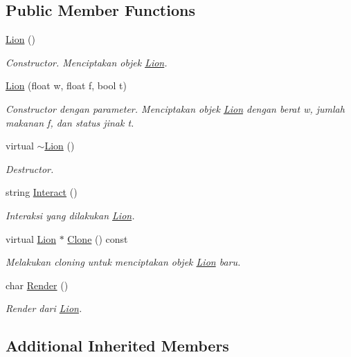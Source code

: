 \subsection*{Public Member Functions}
\begin{DoxyCompactItemize}
\item 
\hyperlink{classLion_a582202364024a9ce10e57f47c872dbc2}{Lion} ()
\begin{DoxyCompactList}\small\item\em Constructor. Menciptakan objek \hyperlink{classLion}{Lion}. \end{DoxyCompactList}\item 
\hyperlink{classLion_a5bc46f23f72bc31fe8ef58db40a62b58}{Lion} (float w, float f, bool t)
\begin{DoxyCompactList}\small\item\em Constructor dengan parameter. Menciptakan objek \hyperlink{classLion}{Lion} dengan berat w, jumlah makanan f, dan status jinak t. \end{DoxyCompactList}\item 
virtual \hyperlink{classLion_a09c9c113e6ca2d7c7b304b009d61dc62}{$\sim$\+Lion} ()
\begin{DoxyCompactList}\small\item\em Destructor. \end{DoxyCompactList}\item 
string \hyperlink{classLion_a4c090a9b5f42b92c30d223b40435e167}{Interact} ()
\begin{DoxyCompactList}\small\item\em Interaksi yang dilakukan \hyperlink{classLion}{Lion}. \end{DoxyCompactList}\item 
virtual \hyperlink{classLion}{Lion} $\ast$ \hyperlink{classLion_ae63405ef106650644a8fcafc7393284e}{Clone} () const 
\begin{DoxyCompactList}\small\item\em Melakukan cloning untuk menciptakan objek \hyperlink{classLion}{Lion} baru. \end{DoxyCompactList}\item 
char \hyperlink{classLion_ad782de7c88e4a7aad01287a2ed64827c}{Render} ()
\begin{DoxyCompactList}\small\item\em Render dari \hyperlink{classLion}{Lion}. \end{DoxyCompactList}\end{DoxyCompactItemize}
\subsection*{Additional Inherited Members}


